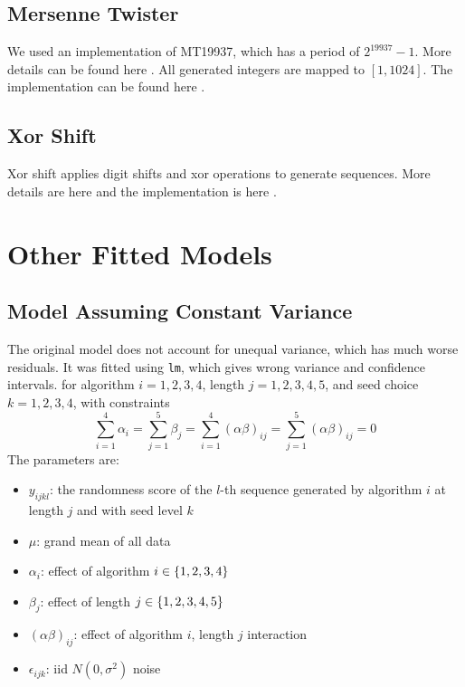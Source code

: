 \documentclass{report}
\begin{document}
\section{Mersenne Twister}
We used an implementation of MT19937, which has a period of $2^{19937}-1$. More details can be found here \parencite{SciMT}. All generated integers are mapped to $[1,1024]$. The implementation can be found here \parencite{Su}.

\section{Xor Shift}
Xor shift applies digit shifts and xor operations to generate sequences. More details are here \parencite{XOR} and the implementation is here \parencite{Su}.

\chapter{Other Fitted Models}
\section{Model Assuming Constant Variance}\label{app:OtherFittedModels:OriginalModel}
The original model does not account for unequal variance, which has much worse residuals. It was fitted using \texttt{lm}, which gives wrong variance and confidence intervals.
for algorithm $i=1,2,3,4$, length $j=1,2,3,4,5$, and seed choice $k=1,2,3,4$, with constraints
\[\sum_{i=1}^4 \alpha_i=\sum_{j=1}^5 \beta_j=\sum_{i=1}^4 (\alpha\beta)_{ij}=\sum_{j=1}^5 (\alpha\beta)_{ij}=0\]
The parameters are:
\begin{itemize}
    \item $y_{ijkl}$: the randomness score of the $l$-th sequence generated by algorithm $i$ at length $j$ and with seed level $k$
    \item $\mu$: grand mean of all data
    \item $\alpha_i$: effect of algorithm $i\in\left\{ {1,2,3,4} \right\}$
    \item $\beta_j$: effect of length $j \in \left\{ {1,2,3,4,5} \right\}$
    \item $(\alpha\beta)_{ij}$: effect of algorithm $i$, length $j$ interaction
    \item $\epsilon_{ijk}$: iid $N(0,\sigma^2)$ noise
\end{itemize}
\end{document}
